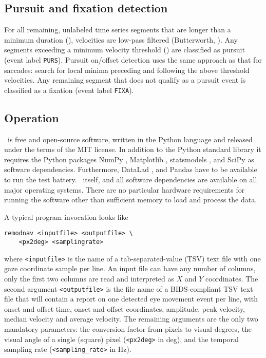 \subsection*{Pursuit and fixation detection}

For all remaining, unlabeled time series segments that are longer than a
minimum duration (), velocities are low-pass
filtered (Butterworth, ). Any segments
exceeding a minimum velocity threshold () are
classified as pursuit (event label \texttt{PURS}). Pursuit on/offset detection
uses the same approach as that for saccades: search for local minima preceding
and following the above threshold velocities.
%
Any remaining segment that does not qualify as a pursuit event is classified
as a fixation (event label \texttt{FIXA}).


\subsection*{Operation}\label{op}

\remodnav\ is free and open-source software, written in the Python language and
released under the terms of the MIT license. In addition to the Python standard
library it requires the Python packages
%
NumPy \citep{oliphant2006guide},
Matplotlib \citep{hunter2007matplotlib},
statsmodels \citep{seabold2010statsmodels},
and SciPy \citep{JOP+2001} as software dependencies.
Furthermore, DataLad \citep{HH+2013},
and Pandas \citep{mckinney2010data}
%
have to be available to run the test
battery. \remodnav\ itself, and all software dependencies are available on all
major operating systems.  There are no particular hardware requirements for
running the software other than sufficient memory to load and process the data.

A typical program invocation looks like
%
\begin{verbatim}
remodnav <inputfile> <outputfile> \
    <px2deg> <samplingrate>
\end{verbatim}
%
where \texttt{<inputfile>} is the name of a tab-separated-value (TSV) text file
with one gaze coordinate sample per line. An input file can have any number of
columns, only the first two columns are read and interpreted as $X$ and $Y$
coordinates. The second argument \texttt{<outputfile>} is the file name of a
BIDS-compliant \citep{gorgolewski2016brain} TSV text file that will contain a
report on one detected eye movement event per line, with onset and offset time,
onset and offset coordinates, amplitude, peak velocity, median velocity and
average velocity. The remaining arguments are the only two mandatory
parameters: the conversion factor from pixels to visual degrees, \ie the visual
angle of a single (square) pixel (\texttt{<px2deg>} in \unit{deg}), and the
temporal sampling rate (\texttt{<sampling\_rate>} in \unit{Hz}).

